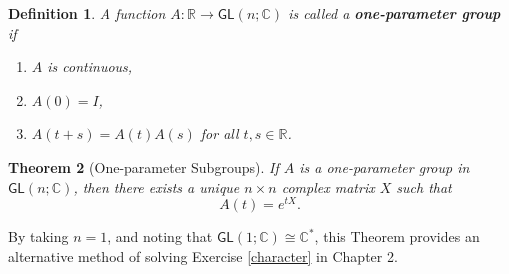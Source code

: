 \documentclass[12pt]{amsbook}
\theoremstyle{plain}
\newtheorem{theorem}{Theorem}
\newtheorem{definition}[theorem]{Definition}
\numberwithin{equation}{chapter}
\numberwithin{theorem}{chapter}
\begin{document}
\begin{definition}
A function $A:\mathbb{R}\rightarrow\mathsf{GL}(n;\mathbb{C})$ is called a
\textbf{one-parameter group} if

\begin{enumerate}
\item $A$ is continuous,

\item $A(0)=I$,

\item $A(t+s)=A(t)A(s)$ for all $t,s\in\mathbb{R}$.
\end{enumerate}
\end{definition}

\begin{theorem}
[One-parameter Subgroups]\label{one.parameter}If $A$ is a one-parameter group
in $\mathsf{GL}(n;\mathbb{C})$, then there exists a unique $n\times n$ complex
matrix $X$ such that
\[
A(t)=e^{tX}\text{.}%
\]
\end{theorem}

By taking $n=1$, and noting that $\mathsf{GL}(1;\mathbb{C})\cong
\mathbb{C}^{\ast}$, this Theorem provides an alternative method of solving
Exercise \ref{character} in Chapter 2.
\end{document}
